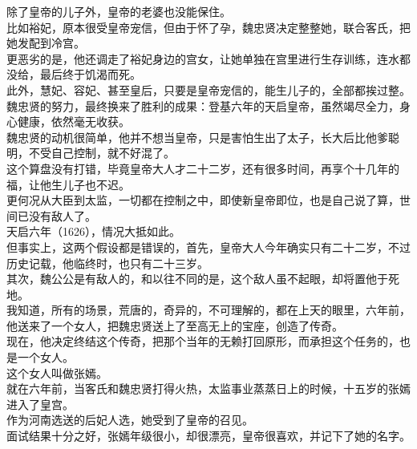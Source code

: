 \begin{multicols}{\theparacolNo}
除了皇帝的儿子外，皇帝的老婆也没能保住。\\

比如裕妃，原本很受皇帝宠信，但由于怀了孕，魏忠贤决定整整她，联合客氏，把她发配到冷宫。\\

更恶劣的是，他还调走了裕妃身边的宫女，让她单独在宫里进行生存训练，连水都没给，最后终于饥渴而死。\\

此外，慧妃、容妃、甚至皇后，只要是皇帝宠信的，能生儿子的，全部都挨过整。\\

魏忠贤的努力，最终换来了胜利的成果：登基六年的天启皇帝，虽然竭尽全力，身心健康，依然毫无收获。\\

魏忠贤的动机很简单，他并不想当皇帝，只是害怕生出了太子，长大后比他爹聪明，不受自己控制，就不好混了。\\

这个算盘没有打错，毕竟皇帝大人才二十二岁，还有很多时间，再享个十几年的福，让他生儿子也不迟。\\

更何况从大臣到太监，一切都在控制之中，即使新皇帝即位，也是自己说了算，世间已没有敌人了。\\

天启六年（1626），情况大抵如此。\\

但事实上，这两个假设都是错误的，首先，皇帝大人今年确实只有二十二岁，不过历史记载，他临终时，也只有二十三岁。\\

其次，魏公公是有敌人的，和以往不同的是，这个敌人虽不起眼，却将置他于死地。\\

我知道，所有的场景，荒唐的，奇异的，不可理解的，都在上天的眼里，六年前，他送来了一个女人，把魏忠贤送上了至高无上的宝座，创造了传奇。\\

现在，他决定终结这个传奇，把那个当年的无赖打回原形，而承担这个任务的，也是一个女人。\\

这个女人叫做张嫣。\\

就在六年前，当客氏和魏忠贤打得火热，太监事业蒸蒸日上的时候，十五岁的张嫣进入了皇宫。\\

作为河南选送的后妃人选，她受到了皇帝的召见。\\

面试结果十分之好，张嫣年级很小，却很漂亮，皇帝很喜欢，并记下了她的名字。\\


\end{multicols}
